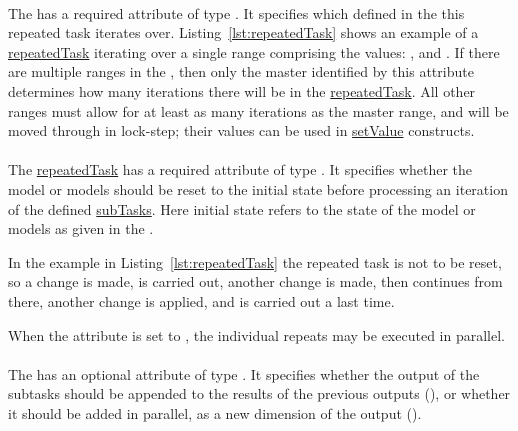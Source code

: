 \paragraph*{}
\label{sec:rangeAttribute}
The \RepeatedTask has a required attribute  of type \SIdRef. It specifies which  defined in the \hyperref[class:listOfRanges]{} this repeated task iterates over. Listing~\ref{lst:repeatedTask} shows an example of a \hyperref[class:repeatedTask]{repeatedTask} iterating over a single range comprising the values: ,  and .
If there are multiple ranges in the \hyperref[class:listOfRanges]{}, then only the master  identified by this attribute determines how many iterations there will be in the \hyperref[class:repeatedTask]{repeatedTask}. All other ranges must allow for at least as many iterations as the master range, and will be moved through in lock-step; their values can be used in \hyperref[class:setValue]{setValue} constructs.

\paragraph*{}
\label{sec:resetModel}
The \hyperref[class:repeatedTask]{repeatedTask} has a required attribute  of type . It specifies whether the model or models should be reset to the initial state before processing an iteration of the defined \hyperref[class:subTask]{subTasks}. Here initial state refers to the state of the model or models as given in the \hyperref[class:listOfModels]{}.

In the example in  Listing~\ref{lst:repeatedTask} the repeated task is not to be reset, so a change is made,  is carried out, another change is made, then  continues from there, another change is applied, and  is carried out a last time.

When the  attribute is set to , the individual repeats may be executed in parallel.

\paragraph*{}
\label{sec:concatenateAttribute}
The \RepeatedTask has an optional attribute  of type . It specifies whether the output of the subtasks should be appended to the results of the previous outputs (), or whether it should be added in parallel, as a new dimension of the output ().


